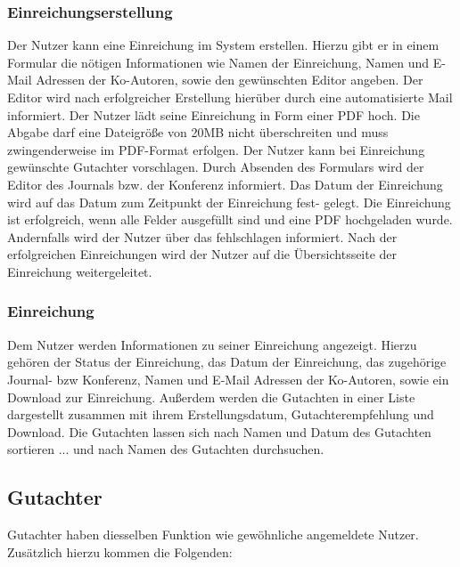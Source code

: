 \subsubsection{Einreichungserstellung}
\begin{description}
     Der Nutzer kann eine Einreichung im System erstellen. Hierzu gibt er in einem
    Formular die nötigen Informationen wie Namen der Einreichung, Namen und E-Mail Adressen der Ko-Autoren,
    sowie den gewünschten Editor angeben. Der Editor wird nach erfolgreicher Erstellung hierüber durch eine
    automatisierte Mail informiert.
     Der Nutzer lädt seine Einreichung in Form einer PDF hoch. Die Abgabe darf eine Dateigröße
    von 20MB nicht überschreiten und muss zwingenderweise im PDF-Format erfolgen.
     Der Nutzer kann bei Einreichung gewünschte Gutachter vorschlagen.
     Durch Absenden des Formulars wird der Editor des Journals bzw. der Konferenz
    informiert. Das Datum der Einreichung wird auf das Datum zum Zeitpunkt der Einreichung fest-
    gelegt.
     Die Einreichung ist erfolgreich, wenn alle Felder ausgefüllt sind und eine PDF
    hochgeladen wurde. Andernfalls wird der Nutzer über das fehlschlagen informiert.
     Nach der erfolgreichen Einreichungen wird der Nutzer auf die Übersichtsseite der
    Einreichung weitergeleitet.
\end{description}

\subsubsection{Einreichung}
\begin{description}
     Dem Nutzer werden Informationen zu seiner Einreichung angezeigt.
    Hierzu gehören der Status der Einreichung, das Datum der Einreichung, das zugehörige
    Journal- bzw Konferenz, Namen und E-Mail Adressen der Ko-Autoren, sowie ein Download zur Einreichung.
     Außerdem werden die Gutachten in einer
    Liste dargestellt zusammen mit ihrem Erstellungsdatum, Gutachterempfehlung und Download. %
    \XXitem{} Die Gutachten lassen sich nach Namen und Datum
    des Gutachten sortieren
    ... und nach Namen des Gutachten durchsuchen.
\end{description}

\subsection{Gutachter}
Gutachter haben diesselben Funktion wie gewöhnliche angemeldete Nutzer. Zusätzlich hierzu kommen
die Folgenden:

